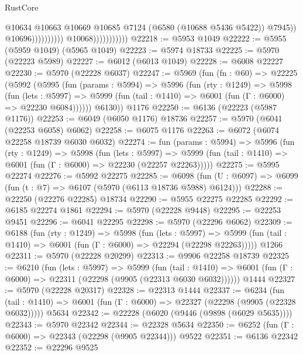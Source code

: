 \begin{lexlean}{RustCore}
\begin{coremodule}
                                                  @10634
                                                  @10663
                                                  @10669
                                                  @10685
                                                  @7124
                                                  (@6580 (@10688 @5436 @5422))
                                                  @7945))
                                              @10696))))))))))
                          @10068)))))))))))
@22218 := @5953 @1049
@22222 := @5955 (@5959 @1049) (@5965 @1049)
@22223 := @5974 @18733
@22225 := @5970 (@22223 @5989)
@22227 := @6012 (@6013 @1049)
@22228 := @6008 @22227
@22230 := @5970 (@22228 @6037)
@22247 := @5969
    (fun (fn : @60) =>
    @22225
      (@5992
        (@5995
          (fun (params : @5994) =>
          @5996
            (fun (rty : @1249) =>
            @5998
              (fun (lets : @5997) =>
              @5999 (fun (tail : @1410) => @6001 (fun (Γ : @6000) => @22230 @6084))))))
        @6130))
    @1176
@22250 := @6136 (@22223 (@5987 @1176))
@22253 := @6049 (@6050 @1176) @18736
@22257 := @5970 (@6041 (@22253 @6058) @6062)
@22258 := @6075 @1176
@22263 := @6072 (@6074 @22258 @18739 @6030 @6032)
@22274 := fun (params : @5994) =>
  @5996
    (fun (rty : @1249) =>
    @5998
      (fun (lets : @5997) =>
      @5999 (fun (tail : @1410) => @6001 (fun (Γ : @6000) => @22230 (@22257 @22263)))))
@22275 := @5995 @22274
@22276 := @5992 @22275
@22285 := @6098
    (fun (U : @6097) => @6099 (fun (t : @7) => @6107 (@5970 (@6113 @18736 @5988) @6124)))
@22288 := @22250 (@22276 @22285) @18734
@22290 := @5955 @22275 @22285
@22292 := @6185 @22274 @1861
@22294 := @5970 (@22228 @9448)
@22295 := @22253 @9451
@22296 := @6041 @22295
@22298 := @5970 (@22296 @6062)
@22309 := @6188
    (fun (rty : @1249) =>
    @5998
      (fun (lets : @5997) =>
      @5999 (fun (tail : @1410) => @6001 (fun (Γ : @6000) => @22294 (@22298 @22263)))))
    @1266
@22311 := @5970 (@22228 @20299)
@22313 := @9906 @22258 @18739
@22325 := @6210
    (fun (lets : @5997) =>
    @5999
      (fun (tail : @1410) =>
      @6001 (fun (Γ : @6000) => @22311 (@22298 (@9905 (@22313 @6030 @6032))))))
    @1444
@22327 := @5970 (@22228 @20317)
@22328 := @22313 @1444
@22337 := @6234
    (fun (tail : @1410) => @6001 (fun (Γ : @6000) => @22327 (@22298 (@9905 (@22328 @6032)))))
    @5634
@22342 := @22228 (@6020 (@9446 (@9898 (@6029 @5635))))
@22343 := @5970 @22342
@22344 := @22328 @5634
@22350 := @6252 (fun (Γ : @6000) => @22343 (@22298 (@9905 @22344))) @9522
@22351 := @6136 @22342
@22352 := @22296 @9525

\end{coremodule}
\end{lexlean}
